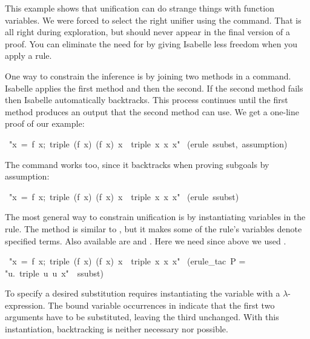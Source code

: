\medskip
This example shows that unification can do strange things with
function variables.  We were forced to select the right unifier using the
 command.  That is all right during exploration, but 
should never appear in the final version of a proof.  You can eliminate the
need for  by giving Isabelle less freedom when you apply a rule.

One way to constrain the inference is by joining two methods in a 
 command. Isabelle  applies the first method and then the
second. If the second method  fails then Isabelle automatically backtracks.
This process continues until  the first method produces an output that the
second method can  use. We get a one-line proof of our example: 
\begin{isabelle}
\ "\isasymlbrakk x\ =\ f\ x;\ triple\ (f\ x)\ (f\ x)\ x\isasymrbrakk\
\isasymLongrightarrow\ triple\ x\ x\ x"\isanewline
{}\ (erule\ ssubst,\ assumption)\isanewline
{}
\end{isabelle}

\noindent
The  command works too, since it backtracks when
proving subgoals by assumption:
\begin{isabelle}
\ "\isasymlbrakk x\ =\ f\ x;\ triple\ (f\ x)\ (f\ x)\ x\isasymrbrakk\
\isasymLongrightarrow\ triple\ x\ x\ x"\isanewline
\isacommand{by}\ (erule\ ssubst)
\end{isabelle}


The most general way to constrain unification is 
by instantiating variables in the rule.  The method  is
similar to \isa{rule}, but it
makes some of the rule's variables  denote specified terms.  
Also available are {}  and .  Here we need
\isa{erule_tac} since above we used \isa{erule}.
\begin{isabelle}
\isacommand{lemma}\ "\isasymlbrakk x\ =\ f\ x;\ triple\ (f\ x)\ (f\ x)\ x\isasymrbrakk\ \isasymLongrightarrow\ triple\ x\ x\ x"\isanewline
\isacommand{by}\ (erule_tac\ P = "\isasymlambda u.\ triple\ u\ u\ x"\ 
\ ssubst)
\end{isabelle}
%
To specify a desired substitution 
requires instantiating the variable  with a $\lambda$-expression. 
The bound variable occurrences in  indicate that the first two arguments have to be substituted, leaving
the third unchanged.  With this instantiation, backtracking is neither necessary
nor possible.

